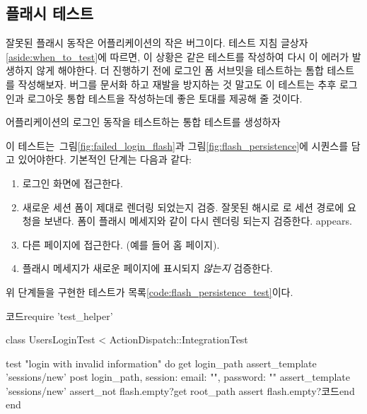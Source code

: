 \subsection{플래시 테스트} \label{sec:a_flash_test} 

잘못된 플래시 동작은 어플리케이션의 작은 버그이다. 테스트 지침 글상자\ref{aside:when_to_test}에 따르면, 이 상황은 같은 테스트를 작성하여 다시 이 에러가 발생하지 않게 해야한다. 더 진행하기 전에 로그인 폼 서브밋을 테스트하는 톰합 테스트를 작성해보자. 버그를 문서화 하고 재발을 방지하는 것 말고도 이 테스트는 추후 로그인과 로그아웃 통합 테스트을 작성하는데 좋은 토대를 제공해 줄 것이다. 

어플리케이션의 로그인 동작을 테스트하는 통합 테스트를 생성하자 


\noindent 이 테스트는~그림\ref{fig:failed_login_flash}과 그림\ref{fig:flash_persistence}에 시퀀스를 담고 있어야한다. 기본적인 단계는 다음과 같다: 

\begin{enumerate} \item 로그인 화면에 접근한다. \item 새로운 세션 폼이 제대로 렌더링 되었는지 검증. 잘못된  해시로 \itempost 로 세션 경로에 요청을 보낸다.  폼이 플래시 메세지와 같이 다시 렌더링 되는지 검증한다. appears. \item 다른 페이지에 접근한다. (예를 들어 홈 페이지). \item 플래시 메세지가 새로운 페이지에 표시되지 \emph{않는지 } 검증한다. \end{enumerate} 

\noindent 위 단계들을 구현한 테스트가 목록\ref{code:flash_persistence_test}이다. 

\newpage

\begin{codelisting} \label{code:flash_persistence_test}  

\begin{code} 코드require 'test_helper' 

class UsersLoginTest < ActionDispatch::IntegrationTest 

test "login with invalid information" do get login_path assert_template 'sessions/new' post login_path, session: { email: "", password: "" } assert_template 'sessions/new' assert_not flash.empty?get root_path assert flash.empty?코드end end \end{code} \end{codelisting} 

